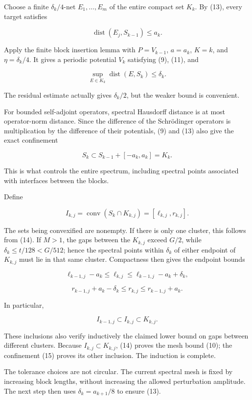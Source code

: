 \documentclass[11pt,a4paper]{article}
\begin{document}
Choose a finite \(\delta_k/4\)-net \(E_1,\ldots,E_m\) of the entire
compact set \(K_k\). By (13), every target satisfies

\[
\operatorname{dist}(E_j,S_{k-1})\leq a_k.
\]

Apply the finite block insertion lemma with \(P=V_{k-1}\), \(a=a_k\),
\(K=k\), and \(\eta=\delta_k/4\). It gives a periodic potential \(V_k\)
satisfying (9), (11), and

\[
\sup_{E\in K_k}\operatorname{dist}(E,S_k)\leq\delta_k.
\tag{14}
\]

The residual estimate actually gives \(\delta_k/2\), but the weaker
bound is convenient.

For bounded self-adjoint operators, spectral Hausdorff distance is at
most operator-norm distance. Since the difference of the Schrödinger
operators is multiplication by the difference of their potentials, (9)
and (13) also give the exact confinement

\[
S_k\subset S_{k-1}+[-a_k,a_k]=K_k.
\tag{15}
\]

This is what controls the entire spectrum, including spectral points
associated with interfaces between the blocks.

Define

\[
I_{k,j}=\operatorname{conv}(S_k\cap K_{k,j})
=[\ell_{k,j},r_{k,j}].
\tag{16}
\]

The sets being convexified are nonempty. If there is only one cluster,
this follows from (14). If \(M>1\), the gaps between the \(K_{k,j}\)
exceed \(G/2\), while \(\delta_k\leq t/128<G/512\); hence the spectral
points within \(\delta_k\) of either endpoint of \(K_{k,j}\) must lie in
that same cluster. Compactness then gives the endpoint bounds

\[
\ell_{k-1,j}-a_k
\leq\ell_{k,j}
\leq\ell_{k-1,j}-a_k+\delta_k,
\tag{17}
\]

\[
r_{k-1,j}+a_k-\delta_k
\leq r_{k,j}
\leq r_{k-1,j}+a_k.
\tag{18}
\]

In particular,

\[
I_{k-1,j}\subset I_{k,j}\subset K_{k,j}.
\tag{19}
\]

These inclusions also verify inductively the claimed lower bound on gaps
between different clusters. Because \(I_{k,j}\subset K_{k,j}\), (14)
proves the mesh bound (10); the confinement (15) proves its other
inclusion. The induction is complete.

The tolerance choices are not circular. The current spectral mesh is
fixed by increasing block lengths, without increasing the allowed
perturbation amplitude. The next step then uses \(\delta_k=a_{k+1}/8\)
to ensure (13).
\end{document}
